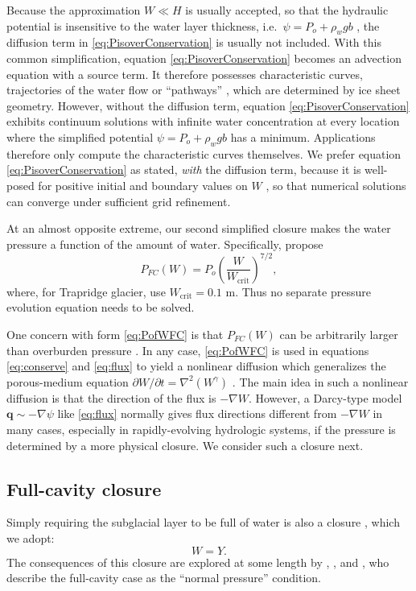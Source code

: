 \documentclass[gmd]{copernicus}   %
\newcommand{\text}{\textrm}
\newcommand\bq{\mathbf{q}}
\newcommand{\grad}{\nabla}
\begin{document}
Because the approximation $W\ll H$ is usually accepted, so that the hydraulic potential is insensitive to the water layer thickness, i.e.~$\psi = P_o + \rho_w g b$ \citep{LeBrocqetal2009}, the diffusion term in \eqref{eq:PisoverConservation} is usually not included.  With this common simplification, equation \eqref{eq:PisoverConservation} becomes an advection equation with a source term.  It therefore possesses characteristic curves, trajectories of the water flow or ``pathways'' \citep{Livingstoneetal2013}, which are determined by ice sheet geometry.  However, without the diffusion term, equation \eqref{eq:PisoverConservation} exhibits continuum solutions with infinite water concentration at every location where the simplified potential $\psi = P_o + \rho_w g b$ has a minimum.  Applications therefore only compute the characteristic curves themselves.  We prefer equation \eqref{eq:PisoverConservation} as stated, \emph{with} the diffusion term, because it is well-posed for positive initial and boundary values on $W$ \citep[compare][]{Hewittetal2012}, so that numerical solutions can converge under sufficient grid refinement.

At an almost opposite extreme, our second simplified closure makes the water pressure a function of the amount of water.  Specifically, \cite{FlowersClarke2002_theory} propose
\begin{equation}
P_{FC}(W) = P_o \left(\frac{W}{W_{\text{crit}}}\right)^{7/2}, \label{eq:PofWFC}
\end{equation}
where, for Trapridge glacier, \cite{FlowersClarke2002_trapridge} use $W_{\text{crit}}=0.1$ m.  Thus no separate pressure evolution equation needs to be solved.

One concern with form \eqref{eq:PofWFC} is that $P_{FC}(W)$ can be arbitrarily larger than overburden pressure \citep{Schoofetal2012}.  In any case, \eqref{eq:PofWFC} is used in equations \eqref{eq:conserve} and \eqref{eq:flux} to yield a nonlinear diffusion which generalizes the porous-medium equation $\partial W/\partial t = \grad^2 (W^\gamma)$ \citep{VazquezPME}.  The main idea in such a nonlinear diffusion is that the direction of the flux is $-\grad W$.  However, a Darcy-type model $\bq \sim -\grad \psi$ like \eqref{eq:flux} normally gives flux directions different from $-\grad W$ in many cases, especially in rapidly-evolving hydrologic systems, if the pressure is determined by a more physical closure.  We consider such a closure next.

\subsection{Full-cavity closure}  Simply requiring the subglacial layer to be full of water is also a closure \citep{Bartholomausetal2011}, which we adopt:
\begin{equation}
W = Y.\label{eq:strongclosure}
\end{equation}
The consequences of this closure are explored at some length by \cite{Schoofetal2012}, \cite{Hewittetal2012}, and \cite{Werderetal2013}, who describe the full-cavity case as the ``normal pressure'' condition.
\end{document}
